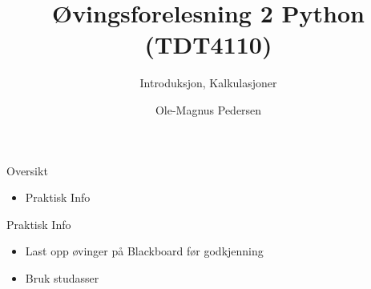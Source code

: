 \documentclass[screen, aspectratio=169]{beamer}
\title[Short title]{Øvingsforelesning 2 Python (TDT4110)}
\subtitle{Introduksjon, Kalkulasjoner}
\author[O.M. Pedersen]{Ole-Magnus Pedersen}
\institute[NTNU]{}
\date{}
\begin{document}
\begin{frame}
  \titlepage
\end{frame}


\begin{frame}{Oversikt}
	\begin{itemize}
			\item Praktisk Info
	\end{itemize}
\end{frame}

\begin{frame}{Praktisk Info}
	\begin{itemize}
		\item Last opp øvinger på Blackboard før godkjenning
		\item Bruk studasser
	\end{itemize}
\end{frame}

\end{document}
